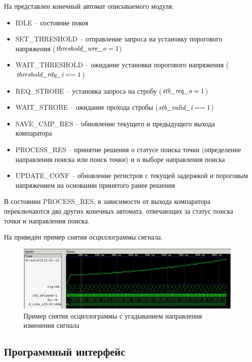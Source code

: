 \FloatBarrier

На  представлен конечный автомат описываемого модуля.

\noindent
\begin{itemize}[label={}]
	\item IDLE -- состояние покоя 
	\item SET\_THRESHOLD -- отправление запроса на установку порогового напряжения ($ \emph{threshold\_wre\_o} = 1 $)
	\item WAIT\_THRESHOLD -- ожидание установки порогового напряжения ($ \emph{threshold\_rdy\_i} == 1 $)
	\item REQ\_STROBE -- установка запроса на стробу ($ \emph{stb\_req\_o} = 1 $)
	\item WAIT\_STROBE -- ожидание прохода стробы ($ \emph{stb\_valid\_i} == 1 $)
	\item SAVE\_CMP\_RES -- обновление текущего и предыдущего выхода компаратора
	\item PROCESS\_RES -- принятие решения о статусе поиска точки (определение направления поиска или поиск точки)
					и о выборе направления поиска
	\item UPDATE\_CONF -- обновление регистров с текущей задержкой и пороговым напряжением на основании принятого ранее решения\\
\end{itemize}

В состоянии PROCESS\_RES, в зависимости от выхода компаратора переключаются два других конечных автомата, отвечающих за статус поиска точки и направления поиска.

На  приведён пример снятия осциллограммы сигнала.

\begin{figure}[ht!] 
	\center
	\includegraphics  {my_folder/images//p_find}
	\caption{Пример снятия осциллограммы с угадыванием направления изменения сигнала} 
	\label{fig:p-find}  
\end{figure}

\subsection{Программный интерфейс}

